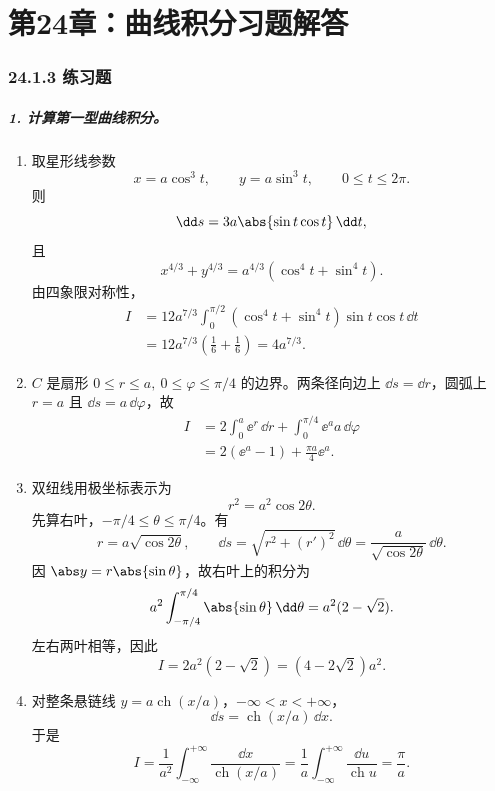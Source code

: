 
\chapter*{第24章：曲线积分习题解答}
\subsection*{24.1.3 练习题}

\paragraph{1. 计算第一型曲线积分。}
\begin{xsolution}
\begin{enumerate}[label=(\arabic*)]
\item 取星形线参数
\[
  x=a\cos^3 t,\qquad y=a\sin^3 t,\qquad 0\le t\le2\pi.
\]
则
\[
  \dd s=3a\abs{\sin t\cos t}\,\dd t,
\]
且
\[
  x^{4/3}+y^{4/3}=a^{4/3}(\cos^4t+\sin^4t).
\]
由四象限对称性，
\begin{align*}
  I
  &=12a^{7/3}\int_0^{\pi/2}(\cos^4t+\sin^4t)\sin t\cos t\,\dd t\\
  &=12a^{7/3}\left(\frac16+\frac16\right)
   =4a^{7/3}.
\end{align*}

\item $C$ 是扇形 $0\le r\le a,\ 0\le\varphi\le\pi/4$ 的边界。两条径向边上 $\dd s=\dd r$，圆弧上 $r=a$ 且 $\dd s=a\,\dd\varphi$，故
\begin{align*}
  I
  &=2\int_0^a\ee^r\,\dd r
    +\int_0^{\pi/4}\ee^a a\,\dd\varphi\\
  &=2(\ee^a-1)+\frac{\pi a}{4}\ee^a.
\end{align*}

\item 双纽线用极坐标表示为
\[
  r^2=a^2\cos2\theta.
\]
先算右叶，$-\pi/4\le\theta\le\pi/4$。有
\[
  r=a\sqrt{\cos2\theta},\qquad
  \dd s=\sqrt{r^2+(r')^2}\,\dd\theta
  =\frac{a}{\sqrt{\cos2\theta}}\,\dd\theta.
\]
因 $\abs y=r\abs{\sin\theta}$，故右叶上的积分为
\[
  a^2\int_{-\pi/4}^{\pi/4}\abs{\sin\theta}\,\dd\theta
  =a^2(2-\sqrt2).
\]
左右两叶相等，因此
\[
  I=2a^2(2-\sqrt2)=(4-2\sqrt2)a^2.
\]

\item 对整条悬链线 $y=a\operatorname{ch}(x/a)$，$-\infty<x<+\infty$，
\[
  \dd s=\operatorname{ch}(x/a)\,\dd x.
\]
于是
\[
  I=\frac1{a^2}\int_{-\infty}^{+\infty}\frac{\dd x}{\operatorname{ch}(x/a)}
  =\frac1a\int_{-\infty}^{+\infty}\frac{\dd u}{\operatorname{ch}u}
  =\frac\pi a.
\]


\end{enumerate}
\end{xsolution}
